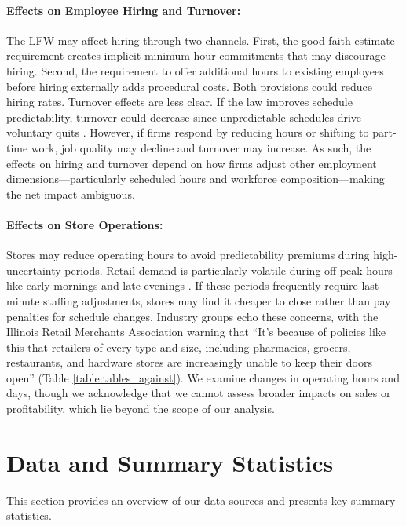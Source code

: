 \documentclass[letterpaper,11pt,leqno]{article}
\theoremstyle{paper}
\begin{document}
\paragraph{Effects on Employee Hiring and Turnover:}
The LFW may affect hiring through two channels. First, the good-faith estimate requirement creates implicit minimum hour commitments that may discourage hiring. Second, the requirement to offer additional hours to existing employees before hiring externally adds procedural costs. Both provisions could reduce hiring rates. Turnover effects are less clear. If the law improves schedule predictability, turnover could decrease since unpredictable schedules drive voluntary quits \citep{schneider2019consequences,lambert_predictability}. However, if firms respond by reducing hours or shifting to part-time work, job quality may decline and turnover may increase. As such, the effects on hiring and turnover depend on how firms adjust other employment dimensions—particularly scheduled hours and workforce composition—making the net impact ambiguous. 


\paragraph{Effects on Store Operations:}
Stores may reduce operating hours to avoid predictability premiums during high-uncertainty periods. Retail demand is particularly volatile during off-peak hours like early mornings and late evenings \citep{netessine_traffic,kesavan_traffic}. If these periods frequently require last-minute staffing adjustments, stores may find it cheaper to close rather than pay penalties for schedule changes. Industry groups echo these concerns, with the Illinois Retail Merchants Association warning that ``It's because of policies like this that retailers of every type and size, including pharmacies, grocers, restaurants, and hardware stores are increasingly unable to keep their doors open'' (Table \ref{table:tables_against}). We examine changes in operating hours and days, though we acknowledge that we cannot assess broader impacts on sales or profitability, which lie beyond the scope of our analysis.
\section{Data and Summary Statistics} \label{sec:data}

This section provides an overview of our data sources and presents key summary statistics. 
\end{document}
